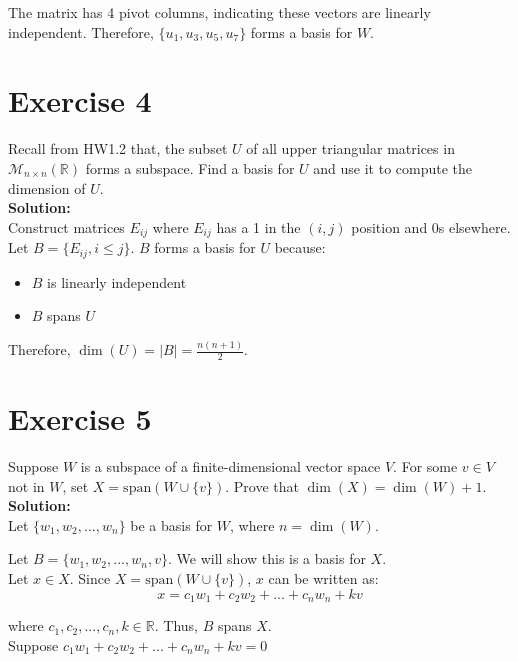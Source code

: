 \documentclass{article}
\begin{document}
The matrix has 4 pivot columns, indicating these vectors are linearly independent. Therefore, $\{u_1, u_3, u_5, u_7\}$ forms a basis for $W$.

\newpage

\section*{Exercise 4}
Recall from HW1.2 that, the subset $U$ of all upper triangular matrices in $\mathcal{M}_{n\times n}(\mathbb{R})$ forms a subspace. Find a basis for $U$ and use it to compute the dimension of $U$. \\

\textbf{Solution:} \\

Construct matrices $E_{ij}$ where $E_{ij}$ has a 1 in the $(i,j)$ position and 0s elsewhere. \\

Let $B = \{E_{ij}, i \leq j\}$. $B$ forms a basis for $U$ because:
\begin{itemize}
\item $B$ is linearly independent
\item $B$ spans $U$
\end{itemize}

Therefore, $\dim(U) = |B| = \frac{n(n+1)}{2}$.

\newpage

\section*{Exercise 5}
Suppose $W$ is a subspace of a finite-dimensional vector space $V$. For some $v \in V$ not in $W$, set $X = \text{span}(W \cup \{v\})$. Prove that $\dim(X) = \dim(W) + 1$. \\

\textbf{Solution:} \\

Let $\{w_1, w_2, ..., w_n\}$ be a basis for $W$, where $n = \dim(W)$.

Let $B = \{w_1, w_2, ..., w_n, v\}$. We will show this is a basis for $X$. \\

Let $x \in X$. Since $X = \text{span}(W \cup \{v\})$, $x$ can be written as:
\[x = c_1w_1 + c_2w_2 + ... + c_nw_n + kv\]

where $c_1, c_2, ..., c_n, k \in \mathbb{R}$. Thus, $B$ spans $X$. \\

Suppose $c_1w_1 + c_2w_2 + ... + c_nw_n + kv = 0$ \\
\end{document}
